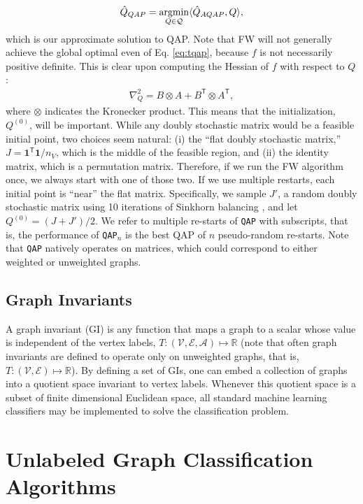 \documentclass{article} %
\providecommand{\ve}[1]{\boldsymbol{#1}}
\newcommand{\argmin}{\operatornamewithlimits{argmin}}
\newcommand{\T}{^{\ensuremath{\mathsf{T}}}}           %
\providecommand{\mc}[1]{\mathcal{#1}}
\providecommand{\mh}[1]{\hat{#1}}
\newcommand{\Real}{\mathbb{R}}
\newcommand{\qap}{\texttt{QAP} }
\newcommand{\qapn}{\texttt{QAP$_n$} }
\begin{document}
\begin{align}
	\mh{Q}_{QAP} = \argmin_{Q \in \mc{Q}} \langle \mh{Q}_{AQAP}, Q \rangle,
\end{align}
which is our approximate solution to QAP.  Note that FW will not generally achieve the global optimal even of Eq. \eqref{eq:tqap}, because $f$ is not necessarily positive definite.  This is clear upon computing the Hessian of $f$  with respect to $Q$:
\begin{align}
	\nabla_Q^2  =  B \otimes A + B\T \otimes A\T,
\end{align}
where $\otimes$ indicates the Kronecker product. This means that the initialization, $Q^{(0)}$, will be important.  While any doubly stochastic matrix would be a feasible initial point, two choices seem natural: (i) the ``flat doubly  stochastic matrix,'' $J=\ve{1}\T \ve{1}/n_V$, which is the middle of the feasible region, and (ii) the identity matrix, which is a permutation matrix.  Therefore, if we run the FW algorithm once, we always start with one of those two.  If we use multiple restarts, each initial point is ``near'' the flat matrix.  Specifically, we sample $J'$, a random doubly stochastic matrix using 10 iterations of Sinkhorn balancing \cite{Sinkhorn1964}, and let $Q^{(0)}=(J+J')/2$.  We refer to multiple re-starts of \qap with subscripts, that is, the performance of \qapn is the best QAP of $n$ pseudo-random re-starts.  Note that \qap natively operates on matrices, which could correspond to either weighted or unweighted graphs.


\subsection{Graph Invariants} %
\label{sub:graph_invariants}

A graph invariant (GI) is any function that maps a graph to a scalar whose value is independent of the vertex labels, $T: (\mc{V},\mc{E},\mc{A}) \mapsto \Real$ (note that often graph invariants are defined to operate only on unweighted graphs, that is, $T: (\mc{V},\mc{E}) \mapsto \Real$).  By defining a set of GIs, one can embed a collection of graphs into a quotient space invariant to vertex labels.  Whenever this quotient space is a subset of finite dimensional Euclidean space, all standard machine learning classifiers may be implemented to solve the classification problem.  



\section{Unlabeled Graph Classification Algorithms} %
\label{sec:algorithms}
\end{document}
